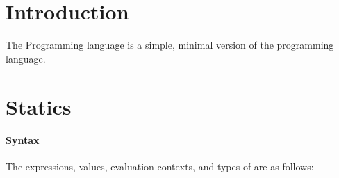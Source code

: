 \documentclass{scrartcl}
\begin{document}
\title{\TheLang{}}

\maketitle

\section{Introduction}
\label{sec:intro}
The Programming language \TheLang{} is a simple, minimal version of the \ML{} programming language.

\section{Statics}
\label{sec:statics}

\paragraph{Syntax}
The expressions, values, evaluation contexts, and types of \TheLang{} are as follows:
\end{document}
